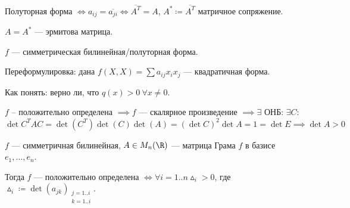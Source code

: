  Полуторная форма $\iff a_{ij} = \overline{a_{ji}} \iff \overline{A^T} = A$,  $A^* \coloneqq \overline{A^T}$ матричное сопряжение.

  $A = A^*$ --- эрмитова матрица.

 $f$ --- симметрическая билинейная/полуторная форма.

 Переформулировка: дана  $f(X, X) = \sum a_{ij} x_i x_j$ --- квадратичная форма.

 Как понять: верно ли, что  $q(x) > 0 \ \forall x \neq 0$.

  $f$ -- положительно определена  $\implies f$ --- скалярное произведение  $\implies \exists $ ОНБ:  $\exists C\!:$  $\det C^TAC = \det(C^T)\det(C)\det(A) = (\det C)^2 \det A = 1 = \det E \implies \det A > 0$

  \begin{theorem}
    $f$ --- симметричная билинейная,  $A \in M_n(\R)$ --- матрица Грама  $f$  в базисе $e_1, \ldots, e_n$.

    Тогда $f$ --- положительно определена  $\iff \forall i = 1..n \vartriangle_i > 0$, где $\vartriangle_i \coloneqq \det(a_{jk})_{\substack{j=1..i\\k=1..i}}$.
\end{theorem}
